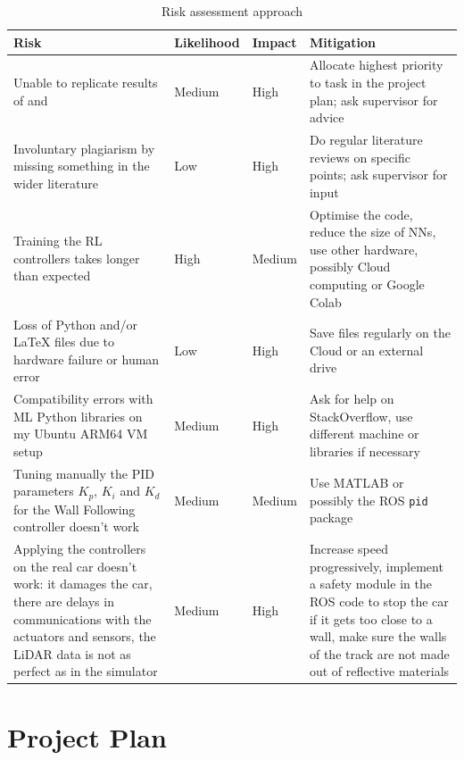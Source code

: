 \begin{table}
\centering
\begin{tabularx}{\textwidth}{||X|X|X|X||} 
 \hline
 Risk & Likelihood & Impact & Mitigation\\ [0.5ex] 
 \hline\hline
 Unable to replicate results of \cite{bosello} and \cite{Reference4} & Medium & High & Allocate highest priority to task in the project plan; ask supervisor for advice\\
 \hline
  Involuntary plagiarism by missing something in the wider literature & Low & High & Do regular literature reviews on specific points; ask supervisor for input\\
  
  \hline
  Training the RL controllers takes longer than expected & High & Medium & Optimise the code, reduce the size of NNs, use other hardware, possibly Cloud computing or Google Colab\\ [1ex]

 \hline
  Loss of Python and/or \LaTeX $ $ files due to hardware failure or human error& Low & High & Save files regularly on the Cloud or an external drive\\ [1ex]
 
   \hline
  Compatibility errors with ML Python libraries on my Ubuntu ARM64 VM setup & Medium & High & Ask for help on StackOverflow, use different machine or libraries if necessary\\
  
   \hline
  Tuning manually the PID parameters $K_p$, $K_i$ and $K_d$ for the Wall Following controller doesn't work & Medium & Medium & Use MATLAB or possibly the ROS \verb |pid| package\\
  
 \hline
    Applying the controllers on the real car doesn't work: it damages the car, there are delays in communications with the actuators and sensors, the LiDAR data is not as perfect as in the simulator & Medium & High & Increase speed progressively, implement a safety module in the ROS code to stop the car if it gets too close to a wall, make sure the walls of the track are not made out of reflective materials\\ [1ex]
   
 \hline
 
\end{tabularx}
\caption{Risk assessment approach}
\label{risktab}
\end{table}


\section{Project Plan}
\label{propla}

